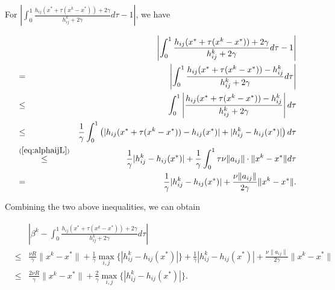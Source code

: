 \documentclass[12pt]{article}
\newcommand{\newalpha}{h}
\begin{document}
For $\left| \int_{0}^1 \frac{\newalpha_{ij}(x^* + \tau(x^k - x^*)) + 2\gamma}{ h_{ij}^k + 2\gamma} d\tau - 1   \right|$, we have 

\begin{eqnarray*}
	&& \left| \int_{0}^1 \frac{\newalpha_{ij}(x^* + \tau(x^k - x^*)) + 2\gamma}{ h_{ij}^k + 2\gamma} d\tau - 1   \right| \\ 
	&=& \left|  \int_{0}^1  \frac{\newalpha_{ij}(x^* + \tau(x^k - x^*)) - h_{ij}^k}{ h_{ij}^k + 2\gamma} d\tau  \right| \\ 
	&\leq& \int_{0}^1 \left|   \frac{\newalpha_{ij}(x^* + \tau(x^k - x^*)) - h_{ij}^k}{ h_{ij}^k + 2\gamma}  \right| d\tau \\ 
	&\leq& \frac{1}{\gamma} \int_{0}^1 \left(  |\newalpha_{ij}(x^* + \tau(x^k - x^*)) - \newalpha_{ij}(x^*)| + |h_{ij}^k - \newalpha_{ij}(x^*)|  \right) d\tau \\ 
	&\overset{(\ref{eq:alphaijL})}{\leq}& \frac{1}{\gamma} |h_{ij}^k - \newalpha_{ij}(x^*)| + \frac{1}{\gamma} \int_{0}^1 \tau \nu \|a_{ij}\| \cdot \|x^k - x^*\| d\tau \\ 
	&=& \frac{1}{\gamma} |h_{ij}^k - \newalpha_{ij}(x^*)|  + \frac{\nu \|a_{ij}\|}{2\gamma} \|x^k - x^*\|. 
\end{eqnarray*}

Combining the two above inequalities, we can obtain 

\begin{eqnarray}
&& \left|   \beta^k - \int_{0}^1 \frac{\newalpha_{ij}(x^* + \tau(x^k - x^*)) + 2\gamma}{ h_{ij}^k + 2\gamma} d\tau   \right| \nonumber \\ 
&\leq& \frac{\nu R}{\gamma} \|x^k - x^*\| + \frac{1}{\gamma} \max_{i, j} \{|h_{ij}^k - \newalpha_{ij}(x^*)| \} + \frac{1}{\gamma} |h_{ij}^k - \newalpha_{ij}(x^*)|  + \frac{\nu \|a_{ij}\|}{2\gamma} \|x^k - x^*\| \nonumber \\ 
&\leq&  \frac{2\nu R}{\gamma} \|x^k - x^*\| + \frac{2}{\gamma} \max_{i, j} \{|h_{ij}^k - \newalpha_{ij}(x^*)| \}. \label{eq:betak-2}
\end{eqnarray}
\end{document}
